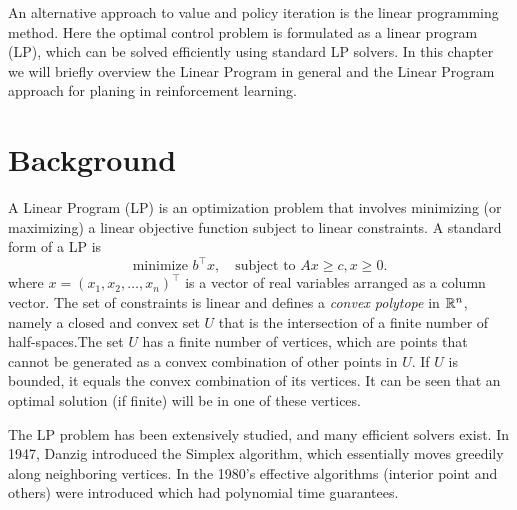 




An alternative approach to value and policy iteration is the linear programming method. Here the optimal control problem is formulated as a linear program (LP), which can be solved efficiently using standard LP solvers.  
%
In this chapter we will briefly overview the Linear Program in general and the Linear Program approach for planing in reinforcement learning.


\section{Background}

A Linear Program (LP) is an optimization problem that involves
minimizing (or maximizing) a linear objective function subject to
linear constraints. A standard form of a LP is
\begin{equation}\label{eq:LP}
 \textrm{minimize } {b^\top}x,   \quad \textrm{subject to } Ax \ge c,  x \ge 0.
\end{equation}
where $x = {({x_1},{x_2}, \ldots ,{x_n})^\top}$ is a vector of real
variables arranged as a column vector. The set of constraints is
linear and defines a \emph{convex polytope} in $\mathbb{R}^n$, namely a
closed and convex set $U$ that is the intersection of a finite
number of half-spaces.The set  $U$ has a finite number of vertices, which are points that cannot be generated as a convex combination of other points in $U$. If $U$ is bounded, it equals the convex combination of its vertices. It can be seen that an optimal solution (if finite) will be in one of these vertices.

The LP problem has been extensively studied, and many efficient solvers exist. In 1947, Danzig introduced the Simplex algorithm, which essentially moves greedily along neighboring vertices.  In the 1980's effective algorithms (interior point and others) were introduced which had polynomial time guarantees.

